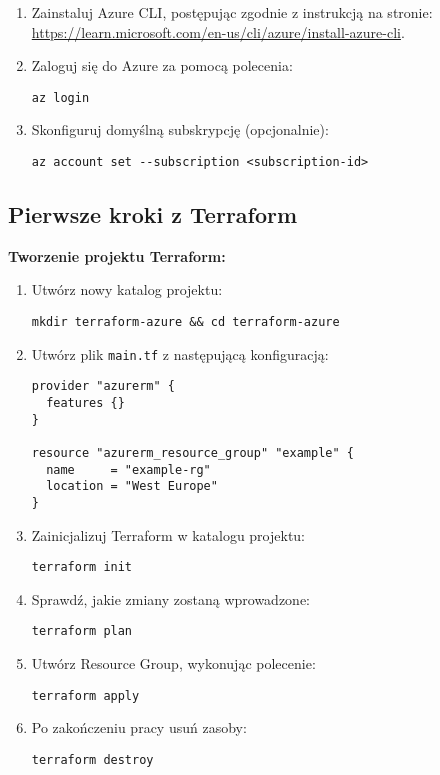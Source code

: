 \documentclass{article}
\begin{document}
\begin{enumerate}
    \item Zainstaluj Azure CLI, postępując zgodnie z instrukcją na stronie: \url{https://learn.microsoft.com/en-us/cli/azure/install-azure-cli}.
    \item Zaloguj się do Azure za pomocą polecenia:
    \begin{lstlisting}
az login
    \end{lstlisting}
    \item Skonfiguruj domyślną subskrypcję (opcjonalnie):
    \begin{lstlisting}
az account set --subscription <subscription-id>
    \end{lstlisting}
\end{enumerate}

\subsection{Pierwsze kroki z Terraform}
\textbf{Tworzenie projektu Terraform:}
\begin{enumerate}
    \item Utwórz nowy katalog projektu:
    \begin{lstlisting}
mkdir terraform-azure && cd terraform-azure
    \end{lstlisting}
    \item Utwórz plik \texttt{main.tf} z następującą konfiguracją:
    \begin{lstlisting}
provider "azurerm" {
  features {}
}

resource "azurerm_resource_group" "example" {
  name     = "example-rg"
  location = "West Europe" 
}
    \end{lstlisting}
    \item Zainicjalizuj Terraform w katalogu projektu:
    \begin{lstlisting}
terraform init
    \end{lstlisting}
    \item Sprawdź, jakie zmiany zostaną wprowadzone:
    \begin{lstlisting}
terraform plan
    \end{lstlisting}
    \item Utwórz Resource Group, wykonując polecenie:
    \begin{lstlisting}
terraform apply
    \end{lstlisting}
    \item Po zakończeniu pracy usuń zasoby:
    \begin{lstlisting}
terraform destroy
    \end{lstlisting}
\end{enumerate}
\end{document}
